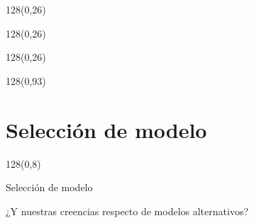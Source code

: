 \documentclass[shownotes]{beamer}
\begin{document}
\begin{frame}
\begin{textblock}{128}(0,26)
\centering
{}
\end{textblock}

\begin{textblock}{128}(0,26)
\centering
{}
\end{textblock}

\begin{textblock}{128}(0,26)
\centering
{}
\end{textblock}

\begin{textblock}{128}(0,93)
\centering
{}
\end{textblock}
\end{frame}




\section{Selecci\'on de modelo}

\begin{frame}
\begin{textblock}{128}(0,8)
 \begin{center}
  \Large Selecci\'on de modelo
 \end{center}
\end{textblock}

 \begin{center}
 \large ¿Y nuestras creencias respecto de modelos alternativos?  
 \end{center}
 
 
\end{frame}
\end{document}

